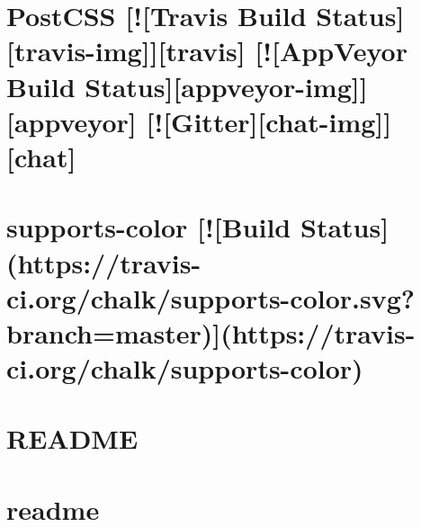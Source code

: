 \documentclass[twoside]{book}
\newcommand{\+}{\discretionary{\mbox{\scriptsize$\hookleftarrow$}}{}{}}
\begin{document}
\chapter{Post\+C\+SS \mbox{[}!\mbox{[}Travis Build Status\mbox{]}\mbox{[}travis-\/img\mbox{]}\mbox{]}\mbox{[}travis\mbox{]} \mbox{[}!\mbox{[}App\+Veyor Build Status\mbox{]}\mbox{[}appveyor-\/img\mbox{]}\mbox{]}\mbox{[}appveyor\mbox{]} \mbox{[}!\mbox{[}Gitter\mbox{]}\mbox{[}chat-\/img\mbox{]}\mbox{]}\mbox{[}chat\mbox{]}}
\label{md__c_1_workspace_demo_src_main_script_node_modules_postcss-modules-local-by-default_node_modules_postcss__r_e_a_d_m_e}

\chapter{supports-\/color \mbox{[}!\mbox{[}Build Status\mbox{]}(https\+://travis-\/ci.org/chalk/supports-\/color.svg?branch=master)\mbox{]}(https\+://travis-\/ci.org/chalk/supports-\/color)}
\label{md__c_1_workspace_demo_src_main_script_node_modules_postcss-modules-local-by-default_node_modules_supports-color_readme}

\chapter{R\+E\+A\+D\+ME}
\label{md__c_1_workspace_demo_src_main_script_node_modules_postcss-modules-local-by-default__r_e_a_d_m_e}

\chapter{readme}
\label{md__c_1_workspace_demo_src_main_script_node_modules_postcss-modules-scope_node_modules_chalk_readme}

\end{document}
